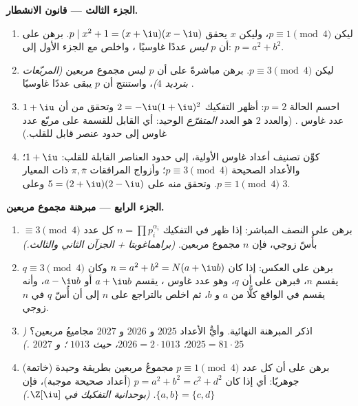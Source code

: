 \begin{problem}
\medskip
\noindent\textbf{الجزء الثالث --- قانون الانشطار.}
\begin{enumerate}[resume]
  \item ليكن $p \equiv 1 \pmod 4$، وليكن $x$ يحقق $p \mid x^2 + 1 =
        (x + \iu)(x - \iu)$. برهن على أن $p$
        \emph{ليس} عددًا غاوسيًا ، واخلص مع الجزء الأول
        إلى: $p = a^2 + b^2$.
  \item ليكن $p \equiv 3 \pmod 4$. برهن مباشرةً على أن $p$ ليس مجموع مربعين
        \emph{(المربّعات بترديد $4$)}، واستنتج أن $p$ يبقى عددًا
        غاوسيًا .
  \item احسم الحالة $p = 2$: أظهر التفكيك $2 =
        -\iu(1+\iu)^2$ وتحقق من أن
        $1 + \iu$ عدد غاوس . (والعدد $2$ هو العدد 
        \emph{المتفرّع} الوحيد: أي القابل للقسمة على مربّع عدد
        غاوس  إلى حدود عنصر قابل للقلب.)
  \item كوِّن تصنيف أعداد غاوس الأولية، إلى حدود العناصر القابلة
        للقلب: $1 + \iu$؛ والأعداد الصحيحة $p \equiv 3 \pmod 4$؛ وأزواج
        المرافقات $\pi, \bar\pi$ ذات المعيار $p \equiv 1 \pmod
        4$. وتحقق منه
        على $5 = (2+\iu)(2-\iu)$ وعلى $3$.
\end{enumerate}

\medskip
\noindent\textbf{الجزء الرابع --- مبرهنة مجموع مربعين.}
\begin{enumerate}[resume]
  \item برهن على النصف المباشر: إذا ظهر في التفكيك $n =
        \prod p_i^{\alpha_i}$ كل
        عدد  $\equiv 3 \pmod 4$ بأُسّ زوجي، فإن $n$ مجموع مربعين.
        \emph{(براهماغوبتا + الجزآن الثاني والثالث.)}
  \item برهن على العكس: إذا كان $n = a^2 + b^2 = N(a + \iu b)$ وكان $q \equiv 3 \pmod 4$ يقسم $n$،
        فبرهن على أن $q$، وهو عدد غاوس ، يقسم $a + \iu b$ أو
        $a - \iu b$، وأنه يقسم في الواقع كلًّا من $a$ و $b$، ثم
        اخلص بالتراجع على $n$ إلى أن أُسّ $q$ في $n$ زوجي.
  \item اذكر المبرهنة النهائية. وأيُّ الأعداد $2025$ و $2026$
        و $2027$ مجاميعُ مربعين؟ \emph{($2025 = 81 \cdot 25$؛ $2026 = 2 \cdot 1013$، حيث
        $1013$ ؛ و $2027$ .)}
  \item (خاتمة) برهن على أن كل عدد  $p \equiv 1 \pmod 4$ مجموعُ مربعين
        بطريقة وحيدة جوهريًا: أي إذا كان $p =
        a^2 + b^2 = c^2 + d^2$ (أعداد صحيحة
        موجبة)، فإن $\{a, b\}
        = \{c, d\}$. \emph{(بوحدانية التفكيك في
        $\Z[\iu]$.)}
\end{enumerate}


\end{problem}
